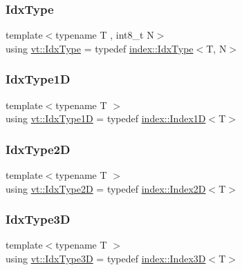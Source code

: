 \mbox{\label{namespacevt_a906c25b521ff516f5e8ba6d96fe2d424}} 
\subsubsection{\texorpdfstring{Idx\+Type}{IdxType}}
{\footnotesize\ttfamily template$<$typename T , int8\+\_\+t N$>$ \\
using \hyperlink{namespacevt_a906c25b521ff516f5e8ba6d96fe2d424}{vt\+::\+Idx\+Type} = typedef \hyperlink{namespacevt_1_1index_a939bace7aba6cd4a76b2c12a138c5991}{index\+::\+Idx\+Type}$<$T, N$>$}

\mbox{\label{namespacevt_a36127c6500f2311908c959be653da40e}} 
\subsubsection{\texorpdfstring{Idx\+Type1D}{IdxType1D}}
{\footnotesize\ttfamily template$<$typename T $>$ \\
using \hyperlink{namespacevt_a36127c6500f2311908c959be653da40e}{vt\+::\+Idx\+Type1D} = typedef \hyperlink{namespacevt_1_1index_a091a4f5a7a2c993d9727eaa60cf67d81}{index\+::\+Index1D}$<$T$>$}

\mbox{\label{namespacevt_ab0fbc5ddf69b5aa0ed6a8d1658b504eb}} 
\subsubsection{\texorpdfstring{Idx\+Type2D}{IdxType2D}}
{\footnotesize\ttfamily template$<$typename T $>$ \\
using \hyperlink{namespacevt_ab0fbc5ddf69b5aa0ed6a8d1658b504eb}{vt\+::\+Idx\+Type2D} = typedef \hyperlink{namespacevt_1_1index_a8373801efc8343f24d6e8ba57df40a69}{index\+::\+Index2D}$<$T$>$}

\mbox{\label{namespacevt_a65e4a83c0567ecb7a54b78e9b8e7d7ab}} 
\subsubsection{\texorpdfstring{Idx\+Type3D}{IdxType3D}}
{\footnotesize\ttfamily template$<$typename T $>$ \\
using \hyperlink{namespacevt_a65e4a83c0567ecb7a54b78e9b8e7d7ab}{vt\+::\+Idx\+Type3D} = typedef \hyperlink{namespacevt_1_1index_a2c09a09f7346d370a0bcbbfb0d4459cd}{index\+::\+Index3D}$<$T$>$}

